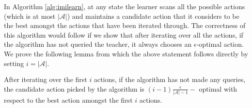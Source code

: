 In Algorithm \ref{alg:imilearn}, at any state the learner scans all the possible actions (which is at most $|\mathcal{A}|$) and maintains a candidate action that it considers to be the best amongst the actions that have been iterated through. The correctness of this algorithm would follow if we show that after iterating over all the actions, if the algorithm has not queried the teacher, it always chooses an $\epsilon$-optimal action. We prove the following lemma from which the above statement follows directly by setting $i=|\mathcal{A}|$. 

\begin{thm} After iterating over the first $i$ actions, if the algorithm has not made any queries, the candidate action picked by the algorithm is $(i-1)\displaystyle\frac{\epsilon}{|\mathcal{A}|-1}-$ optimal with respect to the best action amongst the first $i$ actions.
\end{thm}

